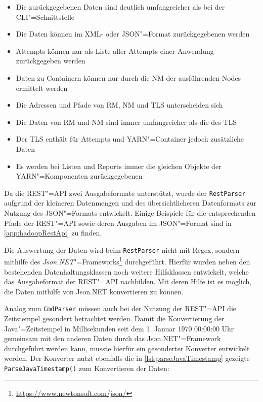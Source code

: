 \begin{itemize}
    \item Die zurückgegebenen Daten sind deutlich umfangreicher als bei der \gls{CLI}"=Schnittstelle
    \item Die Daten können im XML- oder JSON"=Format zurückgegebenen werden
    \item Attempts können nur als Liste aller Attempts einer Anwendung zurückgegeben werden
    \item Daten zu Containern können nur durch die \gls{NM} der ausführenden Nodes ermittelt werden
    \item Die Adressen und Pfade von \gls{RM}, \gls{NM} und \gls{TLS} unterscheiden sich
    \item Die Daten von \gls{RM} und \gls{NM} sind immer umfangreicher als die des \gls{TLS}
    \item Der \gls{TLS} enthält für Attempts und YARN"=Container jedoch zusätzliche Daten
    \item Es werden bei Listen und Reports immer die gleichen Objekte der YARN"=Komponenten zurückgegebenen
\end{itemize}

Da die REST"=API zwei Ausgabeformate unterstützt, wurde der \texttt{RestParser} aufgrund der kleineren Datenmengen und des übersichtlicheren Datenformats zur Nutzung des JSON"=Formats entwickelt.
Einige Beispiele für die entsprechenden Pfade der REST"=API sowie deren Ausgaben im JSON"=Format sind in \cref{app:hadoopRestApi} zu finden.

Die Auswertung der Daten wird beim \texttt{RestParser} nicht mit Regex, sondern mithilfe des \emph{Json.NET}"=Frameworks\footnote{\url{https://www.newtonsoft.com/json/}} durchgeführt.
Hierfür wurden neben den bestehenden Datenhaltungsklassen noch weitere Hilfsklassen entwickelt, welche das Ausgabeformat der REST"=API nachbilden.
Mit deren Hilfe ist es möglich, die Daten mithilfe von Json.NET konvertieren zu können.

Analog zum \texttt{CmdParser} müssen auch bei der Nutzung der REST"=API die Zeitstempel gesondert betrachtet werden.
Damit die Konvertierung der Java"=Zeitstempel in Millisekunden seit dem 1. Januar 1970 00:00:00 Uhr gemeinsam mit den anderen Daten durch das Json.NET"=Framework durchgeführt werden kann, musste hierfür ein gesonderter Konverter entwickelt werden.
Der Konverter nutzt ebenfalls die in \cref{lst:parseJavaTimestamp} gezeigte \texttt{ParseJavaTimestamp()} zum Konvertieren der Daten:

